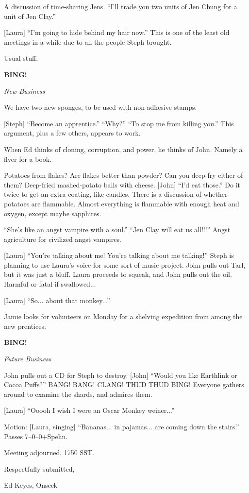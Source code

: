 \documentclass[12pt]{article}
\newcommand{\bing}{{\bf BING!} }
\newcommand{\goto}[1]{\bing \vskip 12pt \centerline{{\em{#1}}}}
\begin{document}
A discussion of time-sharing Jens.  ``I'll trade you two units of
Jen Chung for a unit of Jen Clay.''

[Laura] ``I'm going to hide behind my hair now.''  This is one of the
least old meetings in a while due to all the people Steph brought.

Usual stuff.

\goto{New Business}

We have two new sponges, to be used with non-adhesive stamps.

[Steph] ``Become an apprentice.''  ``Why?''  ``To stop me from killing
you.''  This argument, plus a few others, appears to work.

When Ed thinks of cloning, corruption, and power, he thinks of John.
Namely a flyer for a book.

Potatoes from flakes?  Are flakes better than powder?  Can you deep-fry
either of them?  Deep-fried mashed-potato balls with cheese.  [John]
``I'd eat those.''  Do it twice to get an extra coating, like candles.
There is a discussion of whether potatoes are flammable.  Almost
everything is flammable with enough heat and oxygen, except maybe
sapphires.

``She's like an angst vampire with a soul.''  ``Jen Clay will eat us
all!!!''  Angst agriculture for civilized angst vampires.

[Laura] ``You're talking about me!  You're talking about me talking!''
Steph is planning to use Laura's voice for some sort of music project.
John pulls out Tarl, but it was just a bluff.  Laura proceeds to squeak,
and John pulls out the oil.  Harmful or fatal if swallowed...

[Laura] ``So... about that monkey...''

Jamie looks for volunteers on Monday for a shelving expedition from among
the new prentices.

\goto{Future Business}

John pulls out a CD for Steph to destroy.  [John] ``Would you like
Earthlink or Cocoa Puffs?''  BANG!  BANG!  CLANG!  THUD THUD BING!
Everyone gathers around to examine the shards, and admires them.

[Laura] ``Ooooh I wish I were an Oscar Monkey weiner...''

Motion: [Laura, singing] ``Bananas... in pajamas... are coming down
the stairs.''  Passes 7--0--0+Spehn.

\vspace{12pt}

\noindent
Meeting adjourned, 1750 SST.

\vspace{18pt}

\centerline{Respectfully submitted,}
\centerline{Ed Keyes, Onseck}
\end{document}
